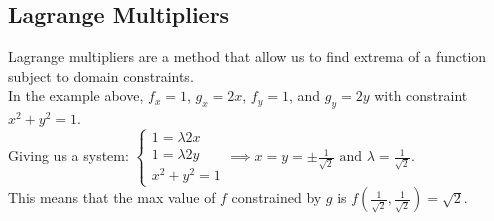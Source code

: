\subsection{Lagrange Multipliers}
\noindent
Lagrange multipliers are a method that allow us to find extrema of a function subject to domain constraints.\\



\noindent
In the example above, $f_x = 1$, $g_x = 2x$, $f_y = 1$, and $g_y = 2y$ with constraint $x^2 + y^2 = 1$.\\ 
Giving us a system:
$\begin{cases}
	1 = \lambda 2x \\ 
	1 = \lambda 2y \\ 
	x^2 + y^2 = 1
\end{cases}
\implies x = y = \pm \frac{1}{\sqrt{2}}\text{ and } \lambda = \frac{1}{\sqrt{2}}$.\\
This means that the max value of $f$ constrained by $g$ is $f\left(\frac{1}{\sqrt{2}},\frac{1}{\sqrt{2}}\right) = \sqrt{2}$.

